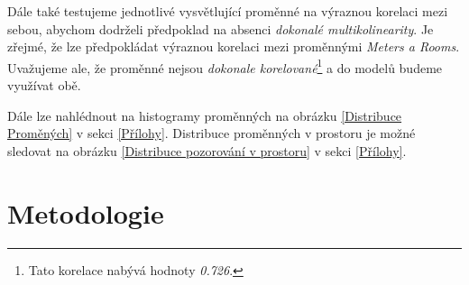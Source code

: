 \documentclass[11pt, a4paper]{article}
\begin{document}
\begin{table}[!htbp] \centering 
  \caption{Popisné statistiky proměnných} 
  \label{Popisné statistiky proměnných} 
\end{table} 

Dále také testujeme jednotlivé vysvětlující proměnné na výraznou korelaci mezi sebou, abychom dodrželi předpoklad na absenci \textit{dokonalé multikolinearity}. Je zřejmé, že lze předpokládat výraznou korelaci mezi proměnnými \textit{Meters a Rooms}. Uvažujeme ale, že proměnné nejsou \textit{dokonale korelované}\footnote{Tato korelace nabývá hodnoty \textit{0.726}.} a do modelů budeme využívat obě.  

Dále lze nahlédnout na histogramy proměnných na obrázku \ref{Distribuce Proměných} v sekci \ref{Přílohy}. Distribuce proměnných v prostoru je možné sledovat na obrázku \ref{Distribuce pozorování v prostoru} v sekci \ref{Přílohy}.

\section{Metodologie}
\end{document}
